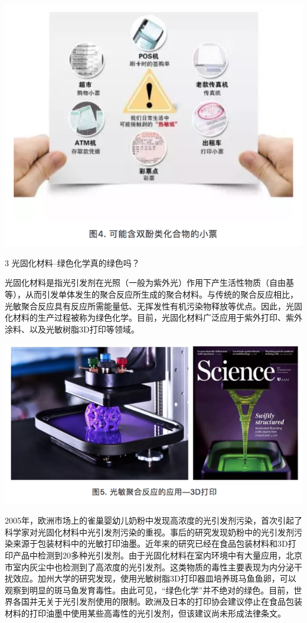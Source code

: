\documentclass[]{book}
\begin{document}
\includegraphics[width=8.33in]{images/epc4}

3 光固化材料--绿色化学真的绿色吗？

光固化材料是指光引发剂在光照（一般为紫外光）作用下产生活性物质（自由基等），从而引发单体发生的聚合反应所生成的聚合材料。与传统的聚合反应相比，光敏聚合反应具有反应所需能量低、无挥发性有机污染物释放等优点。因此，光固化材料的生产过程被称为绿色化学。目前，光固化材料广泛应用于紫外打印、紫外涂料、以及光敏树脂3D打印等领域。

\includegraphics[width=8.33in]{images/epc5}

2005年，欧洲市场上的雀巢婴幼儿奶粉中发现高浓度的光引发剂污染，首次引起了科学家对光固化材料中光引发剂污染的重视。事后的研究发现奶粉中的光引发剂污染来源于包装材料中的光敏打印油墨。近年来的研究已经在食品包装材料和3D打印产品中检测到20多种光引发剂。由于光固化材料在室内环境中有大量应用，北京市室内灰尘中也检测到了高浓度的光引发剂。这类物质的毒性主要表现为内分泌干扰效应。加州大学的研究发现，使用光敏树脂3D打印器皿培养斑马鱼鱼卵，可以观察到明显的斑马鱼发育毒性。由此可见，``绿色化学''并不绝对的绿色。目前，世界各国并无关于光引发剂使用的限制。欧洲及日本的打印协会建议停止在食品包装材料的打印油墨中使用某些高毒性的光引发剂，但该建议尚未形成法律条文。
\end{document}
